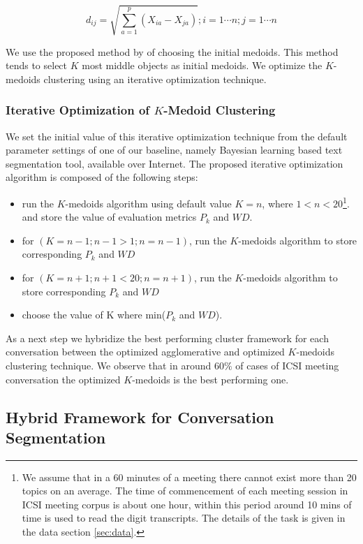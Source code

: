 \documentclass{article}
\begin{document}
$$d_{ij} = \sqrt {\sum_{a=1}^{p} (X_{ia}-X_{ja})}; i=1\cdots n; j = 1 \cdots n$$

We use the proposed method by \cite{park-09} of choosing the initial medoids. This method tends to select $K$ most middle objects as initial medoids. We optimize the $K$-medoids clustering using an iterative optimization technique.

\subsubsection{Iterative Optimization of $K$-Medoid Clustering}\label{sec:optkmclus}
We set the initial value of this iterative optimization technique from the default parameter settings of one of our baseline, namely Bayesian learning based text segmentation tool, available over Internet. The proposed iterative optimization algorithm is composed of the following steps:

\begin{itemize}
\item run the $K$-medoids algorithm using default value $K=n$, where $1<n<20$\footnote{We assume that in a $60$ minutes of a meeting there cannot exist more than 20 topics on an average. The time of commencement of each meeting session in ICSI meeting corpus is about one hour, within this period around 10 mins of time is used to read the digit transcripts. The details of the task is given in the data section \ref{sec:data}.}. and store the value of evaluation metrics $P_k$ and $WD$.
\item for $(K=n-1;n-1>1;n=n-1)$, run the $K$-medoids algorithm to store corresponding $P_k$ and $WD$
\item for $(K=n+1;n+1<20;n=n+1)$, run the $K$-medoids algorithm to store corresponding $P_k$ and $WD$
\item choose the value of K where min($P_k$ and $WD$).
\end{itemize}

As a next step we hybridize the best performing cluster framework for each conversation between the optimized agglomerative and optimized $K$-medoids clustering technique. We observe that in around $60\%$ of cases of ICSI meeting conversation the optimized $K$-medoids is the best performing one.

\subsection{Hybrid Framework for Conversation Segmentation}\label{sec:hyb}
\end{document}
